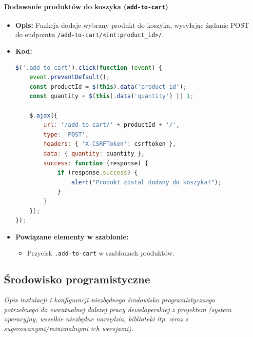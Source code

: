\documentclass[12pt,a4paper,oneside]{article}
\theoremstyle{definition}
\numberwithin{equation}{section}
\begin{document}
\paragraph{Dodawanie produktów do koszyka (\texttt{add-to-cart})}
\begin{itemize}
    \item \textbf{Opis:}  
    Funkcja dodaje wybrany produkt do koszyka, wysyłając żądanie POST do endpointu \texttt{/add-to-cart/<int:product\_id>/}.
    \item \textbf{Kod:}
\begin{lstlisting}[language=JavaScript, caption=Kod funkcji add-to-cart]
$('.add-to-cart').click(function (event) {
    event.preventDefault();
    const productId = $(this).data('product-id');
    const quantity = $(this).data('quantity') || 1;

    $.ajax({
        url: '/add-to-cart/' + productId + '/',
        type: 'POST',
        headers: { 'X-CSRFToken': csrftoken },
        data: { quantity: quantity },
        success: function (response) {
            if (response.success) {
                alert("Produkt zostal dodany do koszyka!");
            }
        }
    });
});
\end{lstlisting}
    \item \textbf{Powiązane elementy w szablonie:}
    \begin{itemize}
        \item Przycisk \texttt{.add-to-cart} w szablonach produktów.
    \end{itemize}
\end{itemize}






\subsection{Środowisko programistyczne}
\textit{Opis instalacji i konfiguracji niezbędnego środowiska programistycznego potrzebnego do ewentualnej dalszej pracy deweloperskiej z projektem (system operacyjny, wszelkie niezbędne narzędzia, biblioteki itp. wraz z sugerowanymi/minimalnymi ich wersjami).}





\renewcommand\refname{Literatura (jeżeli wymagana)}

%
%
%
\end{document}
